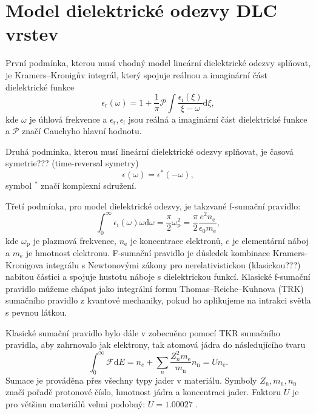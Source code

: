 \chapter{Model dielektrické odezvy DLC vrstev}

První podmínka, kterou musí vhodný model lineární dielektrické odezvy splňovat, je Kramers--Kronigův integrál, který spojuje reálnou a imaginární část dielektrické funkce  
\begin{equation}
\epsilon_\mathrm{r}(\omega) = 1 + \frac{1}{\pi} \mathcal{P} \int \frac{\epsilon_\mathrm{i}(\xi)}{\xi - \omega} \mathrm{d}\xi \mathrm{,}
\label{KKint}
\end{equation}
kde $\omega$ je úhlová frekvence a $\epsilon_\mathrm{r}, \epsilon_\mathrm{i}$ jsou reálná a imaginární část dielektrické funkce a $\mathcal{P}$ značí Cauchyho hlavní hodnotu. 

Druhá podmínka, kterou musí lineární dielektrické odezvy splňovat, je časová symetrie??? (time-reversal symetry)
\begin{equation}
\epsilon(\omega) =\epsilon^* (-\omega) \mathrm{,}
\label{casovasymetrie}
\end{equation}
symbol $^*$ značí komplexní sdružení.

Třetí podmínka, pro model dielektrické odezvy, je takzvané f-sumační pravidlo:
\begin{equation}
\int_0^\infty \epsilon_\mathrm{i} (\omega) \omega \mathrm{d} \omega = \frac{\pi}{2} \omega_\mathrm{p}^2 = \frac{\pi}{2} \frac{e^2 n_\mathrm{e}}{ \epsilon_0 m_\mathrm{e}} \mathrm{,}
\end{equation}
kde $\omega_\mathrm{p}$ je plazmová frekvence, $n_\mathrm{e}$ je koncentrace elektronů, $e$ je elementární náboj a $m_\mathrm{e}$ je hmotnost elektronu. F-sumační pravidlo je důsledek kombinace Kramers-Kronigova integrálu s Newtonovými zákony pro nerelativistickou (klasickou???) nabitou částici a spojuje hustotu náboje s dielektrickou funkcí. Klasické f-sumační pravidlo můžeme chápat jako integrální formu Thomas--Reiche--Kuhnova (TRK) sumačního pravidlo z kvantové mechaniky, pokud ho aplikujeme na intrakci světla s pevnou látkou.  

Klasické sumační pravidlo bylo dále v \cite{sumrule} zobecněno pomocí TKR sumačního pravidla, aby zahrnovalo jak elektrony, tak atomová jádra do následujícího tvaru
\begin{equation}
\int_0^\infty \mathcal{F} \mathrm{d}E = n_e + \sum_n \frac{Z_n^2 m_\mathrm{e}} {m_\mathrm{n}} n_\mathrm{n} = U n_\mathrm{e} \mathrm{.} %
\end{equation}
Sumace je prováděna přes všechny typy jader v materiálu. Symboly $Z_\mathrm{n}, m_\mathrm{n}, n_\mathrm{n}$ značí pořadě protonové číslo, hmotnost jádra a koncentraci jader. Faktoru $U$ je pro většinu materiálů velmi podobný: $U = 1.00027$ \cite{sumrule}.

